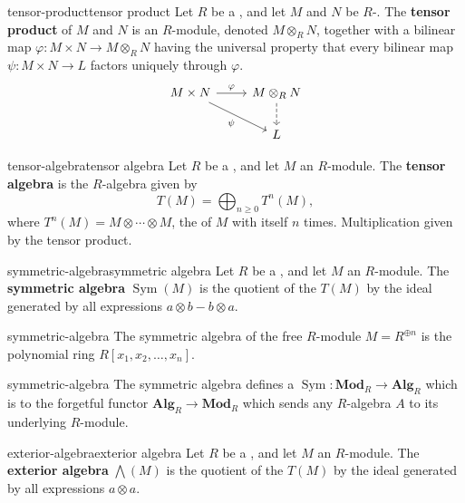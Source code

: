 \begin{topic}{tensor-product}{tensor product}
    Let $R$ be a , and let $M$ and $N$ be $R$-. The \textbf{tensor product} of $M$ and $N$ is an $R$-module, denoted $M \otimes_R N$, together with a bilinear map $\varphi \colon M \times N \to M \otimes_R N$ having the universal property that every bilinear map $\psi \colon M \times N \to L$ factors uniquely through $\varphi$.
    \[ \svg \begin{tikzcd} M \times N \arrow{r}{\varphi} \arrow[swap]{dr}{\psi} & M \otimes_R N \arrow[dashed]{d} \\ & L \end{tikzcd} \]
\end{topic}

\begin{topic}{tensor-algebra}{tensor algebra}
    Let $R$ be a , and let $M$ an $R$-module. The \textbf{tensor algebra} is the $R$-algebra given by
    \[ T(M) = \bigoplus_{n \ge 0} T^n(M) , \]
    where $T^n(M) = M \otimes \cdots \otimes M$, the  of $M$ with itself $n$ times. Multiplication given by the tensor product.
\end{topic}

\begin{topic}{symmetric-algebra}{symmetric algebra}
    Let $R$ be a , and let $M$ an $R$-module. The \textbf{symmetric algebra} $\operatorname{Sym}(M)$ is the quotient of the  $T(M)$ by the ideal generated by all expressions $a \otimes b - b \otimes a$.
\end{topic}

\begin{example}{symmetric-algebra}
    The symmetric algebra of the free $R$-module $M = R^{\oplus n}$ is the polynomial ring $R[x_1, x_2, \ldots, x_n]$.
\end{example}

\begin{example}{symmetric-algebra}
    The symmetric algebra defines a  $\operatorname{Sym} \colon \textbf{Mod}_R \to \textbf{Alg}_R$ which is  to the forgetful functor $\textbf{Alg}_R \to \textbf{Mod}_R$ which sends any $R$-algebra $A$ to its underlying $R$-module.
\end{example}

\begin{topic}{exterior-algebra}{exterior algebra}
    Let $R$ be a , and let $M$ an $R$-module. The \textbf{exterior algebra} $\bigwedge(M)$ is the quotient of the  $T(M)$ by the ideal generated by all expressions $a \otimes a$.
\end{topic}
